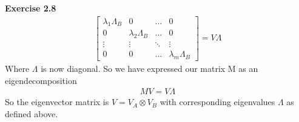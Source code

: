 \documentclass[12pt]{article}
\newenvironment{exercise}[1]{\vspace{.1in}\noindent\textbf{Exercise #1 \hspace{.05em}}}{}
\begin{document}
\begin{exercise}{2.8}
\begin{align}
		\begin{bmatrix}
			\lambda_1\Lambda_B & 0                  & \dots  & 0                  \\
			0                  & \lambda_2\Lambda_B & \dots  & 0                  \\
			\vdots             & \vdots             & \ddots & \vdots             \\
			0                  & 0                  & \dots  & \lambda_m\Lambda_B
		\end{bmatrix}
		=V\Lambda
	\end{align}
	Where $\Lambda$ is now diagonal. So we have expressed our matrix M as an eigendecomposition
	\begin{align}
		MV=V\Lambda
	\end{align}
	So the eigenvector matrix is $V=V_A\otimes V_B$ with corresponding eigenvalues $\Lambda$ as defined above.
\end{exercise}
\end{document}
